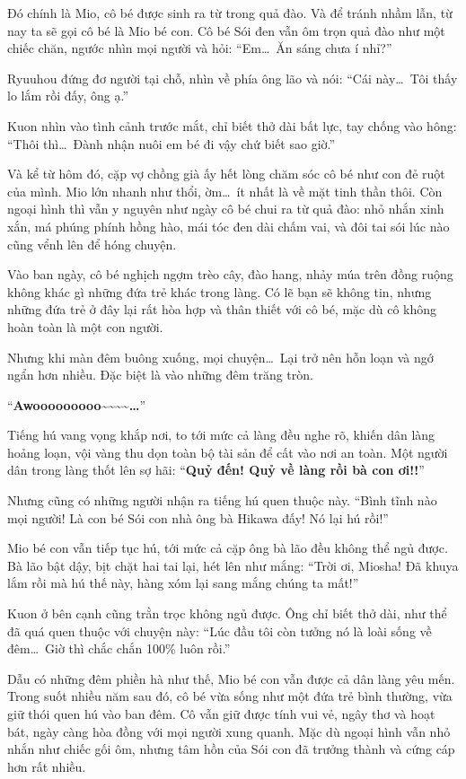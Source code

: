 \documentclass[../main.tex]{subfiles}
\begin{document}
Đó chính là Mio, cô bé được sinh ra từ trong quả đào. Và để tránh nhầm lẫn, từ nay ta sẽ gọi cô bé là Mio bé con. Cô bé Sói đen vẫn ôm trọn quả đào như một chiếc chăn, ngước nhìn mọi người và hỏi: ``Em\dots\ Ăn sáng chưa í nhỉ?''

Ryuuhou đứng đơ người tại chỗ, nhìn về phía ông lão và nói: ``Cái này\dots\ Tôi thấy lo lắm rồi đấy, ông ạ.''

Kuon nhìn vào tình cảnh trước mắt, chỉ biết thở dài bất lực, tay chống vào hông: ``Thôi thì\dots\ Đành nhận nuôi em bé đi vậy chứ biết sao giờ.''

Và kể từ hôm đó, cặp vợ chồng già ấy hết lòng chăm sóc cô bé như con đẻ ruột của mình. Mio lớn nhanh như thổi, ờm\dots\ ít nhất là về mặt tinh thần thôi. Còn ngoại hình thì vẫn y nguyên như ngày cô bé chui ra từ quả đào: nhỏ nhắn xinh xắn, má phúng phính hồng hào, mái tóc đen dài chấm vai, và đôi tai sói lúc nào cũng vểnh lên để hóng chuyện.

Vào ban ngày, cô bé nghịch ngợm trèo cây, đào hang, nhảy múa trên đồng ruộng không khác gì những đứa trẻ khác trong làng. Có lẽ bạn sẽ không tin, nhưng những đứa trẻ ở đây lại rất hòa hợp và thân thiết với cô bé, mặc dù cô không hoàn toàn là một con người.

Nhưng khi màn đêm buông xuống, mọi chuyện\dots\ Lại trở nên hỗn loạn và ngớ ngẩn hơn nhiều. Đặc biệt là vào những đêm trăng tròn.

``\textbf{Awooooooooo\~{}\~{}\~{}\~{}\dots}''

Tiếng hú vang vọng khắp nơi, to tới mức cả làng đều nghe rõ, khiến dân làng hoảng loạn, vội vàng thu dọn toàn bộ tài sản để cất vào nơi an toàn. Một người dân trong làng thốt lên sợ hãi: ``\textbf{Quỷ đến! Quỷ về làng rồi bà con ơi!!}''

Nhưng cũng có những người nhận ra tiếng hú quen thuộc này. ``Bình tĩnh nào mọi người! Là con bé Sói con nhà ông bà Hikawa đấy! Nó lại hú rồi!''

Mio bé con vẫn tiếp tục hú, tới mức cả cặp ông bà lão đều không thể ngủ được. Bà lão bật dậy, bịt chặt hai tai lại, hét lên như mắng: ``Trời ơi, Miosha! Đã khuya lắm rồi mà hú thế này, hàng xóm lại sang mắng chúng ta mất!''

Kuon ở bên cạnh cũng trằn trọc không ngủ được. Ông chỉ biết thở dài, như thể đã quá quen thuộc với chuyện này: ``Lúc đầu tôi còn tưởng nó là loài sống về đêm\dots\ Giờ thì chắc chắn 100\% luôn rồi.''

Dẫu có những đêm phiền hà như thế, Mio bé con vẫn được cả dân làng yêu mến. Trong suốt nhiều năm sau đó, cô bé vừa sống như một đứa trẻ bình thường, vừa giữ thói quen hú vào ban đêm. Cô vẫn giữ được tính vui vẻ, ngây thơ và hoạt bát, ngày càng hòa đồng với mọi người xung quanh. Mặc dù ngoại hình vẫn nhỏ nhắn như chiếc gối ôm, nhưng tâm hồn của Sói con đã trưởng thành và cứng cáp hơn rất nhiều.
\end{document}
